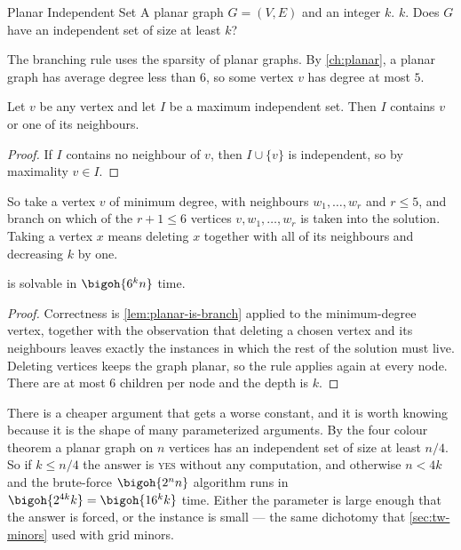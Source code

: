 \begin{probdef}{Planar Independent Set}
  \instance A planar graph $G = (V,E)$ and an integer $k$.
  \parameter $k$.
  \question Does $G$ have an independent set of size at least $k$?
\end{probdef}

The branching rule uses the sparsity of planar graphs. By
\cref{ch:planar}, a planar graph has average degree less than $6$, so some
vertex $v$ has degree at most $5$.

\begin{lemma}\label{lem:planar-is-branch}
Let $v$ be any vertex and let $I$ be a maximum independent set. Then $I$
contains $v$ or one of its neighbours.
\end{lemma}

\begin{proof}
If $I$ contains no neighbour of $v$, then $I \cup \{v\}$ is independent, so by
maximality $v \in I$.
\end{proof}

So take a vertex $v$ of minimum degree, with neighbours $w_1, \ldots, w_r$ and
$r \le 5$, and branch on which of the $r+1 \le 6$ vertices
$v, w_1, \ldots, w_r$ is taken into the solution. Taking a vertex $x$ means
deleting $x$ together with all of its neighbours and decreasing $k$ by one.

\begin{theorem}\label{thm:fpt-planar-is}
 is solvable in $\bigoh{6^k n}$ time.
\end{theorem}

\begin{proof}
Correctness is \cref{lem:planar-is-branch} applied to the minimum-degree
vertex, together with the observation that deleting a chosen vertex and its
neighbours leaves exactly the instances in which the rest of the solution must
live. Deleting vertices keeps the graph planar, so the rule applies again at
every node. There are at most $6$ children per node and the depth is $k$.
\end{proof}

\begin{intuition}
There is a cheaper argument that gets a worse constant, and it is worth knowing
because it is the shape of many parameterized arguments. By the four colour
theorem a planar graph on $n$ vertices has an independent set of size at least
$n/4$. So if $k \le n/4$ the answer is \textsc{yes} without any computation, and
otherwise $n < 4k$ and the brute-force $\bigoh{2^n n}$ algorithm runs in
$\bigoh{2^{4k}k} = \bigoh{16^k k}$ time. Either the parameter is large enough
that the answer is forced, or the instance is small --- the same dichotomy that
\cref{sec:tw-minors} used with grid minors.
\end{intuition}

